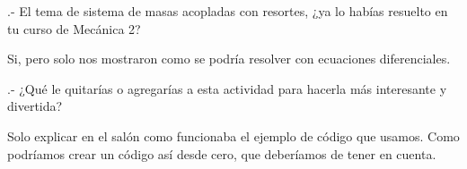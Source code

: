 \documentclass{article}
\begin{document}
.- El tema de sistema de masas acopladas con resortes, ¿ya lo habías resuelto en tu curso de Mecánica 2?  

	\vspace{0.3cm}
Si, pero solo nos mostraron como se podría resolver con ecuaciones diferenciales. 
    \vspace{0.3cm}

.- ¿Qué le quitarías o agregarías a esta actividad para hacerla más interesante y divertida? 

	\vspace{0.3cm}
Solo explicar en el salón como funcionaba el ejemplo de código que usamos. Como podríamos crear un código así desde cero, que deberíamos de tener en cuenta. 
    \vspace{0.3cm}
\end{document}

